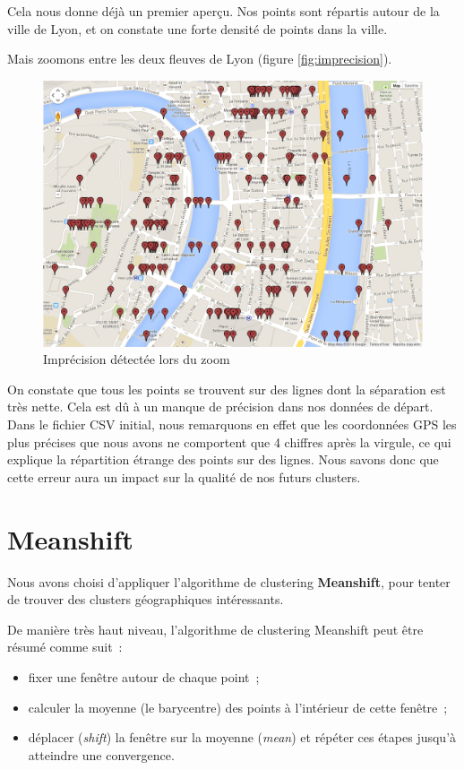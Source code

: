 Cela nous donne déjà un premier aperçu. Nos points sont répartis autour de la ville de Lyon, et on constate une forte densité de points dans la ville.

Mais zoomons entre les deux fleuves de Lyon (figure \vref{fig:imprecision}).

\begin{figure}[!h]
    \centering
    \includegraphics[width=14cm]{images/imprecision.png}
    \caption{Imprécision détectée lors du zoom}
    \label{fig:imprecision}
\end{figure}

On constate que tous les points se trouvent sur des lignes dont la séparation est très nette. Cela est dû à un manque de précision dans nos données de départ. Dans le fichier CSV initial, nous remarquons en effet que les coordonnées GPS les plus précises que nous avons ne comportent que 4 chiffres après la virgule, ce qui explique la répartition étrange des points sur des lignes. Nous savons donc que cette erreur aura un impact sur la qualité de nos futurs clusters.


\section{Meanshift}
Nous avons choisi d'appliquer l'algorithme de clustering \textbf{Meanshift}, pour tenter de trouver des clusters géographiques intéressants.

De manière très haut niveau, l'algorithme de clustering Meanshift peut être résumé comme suit~:
\begin{itemize}
    \item fixer une fenêtre autour de chaque point~;
    \item calculer la moyenne (le barycentre) des points à l'intérieur de cette fenêtre~;
    \item déplacer (\textit{shift}) la fenêtre sur la moyenne (\textit{mean}) et répéter ces étapes jusqu'à atteindre une convergence.\\
\end{itemize}

